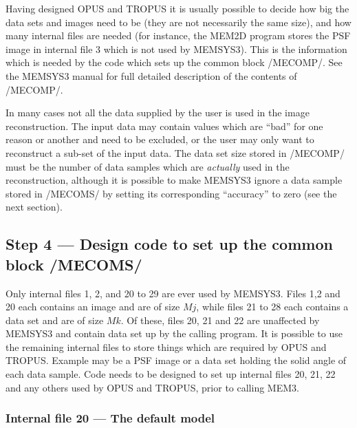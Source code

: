 Having designed OPUS and TROPUS it is usually possible to decide how big the 
data sets and images need to be (they are not necessarily the same size), 
and how many internal files are needed (for instance, the MEM2D program stores 
the PSF image in internal file 3 which is not used by MEMSYS3).
This is the information which is needed by the code which sets up the common 
block /MECOMP/. See the MEMSYS3 manual for full detailed description of the 
contents of /MECOMP/.


In many cases not all the data supplied by the user is used in the image
reconstruction. The input data may contain values which are ``bad'' for one 
reason or another and need to be excluded, or the user may only want to 
reconstruct a sub-set of the input data. The data set size stored in /MECOMP/
must be the number of data samples which are {\em actually} used in the 
reconstruction, although it is possible to make MEMSYS3 ignore a data sample 
stored in /MECOMS/ by setting its corresponding ``accuracy'' to zero (see the 
next section).

\subsection {Step 4 --- Design code to set up the common block /MECOMS/}

Only internal files 1, 2, and 20 to 29 are ever used by MEMSYS3. Files 1,2
and 20 each contains an image and are of size $Mj$, while files 21 to 28 each
contains a data set and are of size $Mk$. Of these, files 20, 21 and 22 are
unaffected by MEMSYS3 and contain data set up by the calling program. It is 
possible to use the remaining internal files to store things which are required 
by OPUS and TROPUS. Example may be a PSF image or a data set holding the solid 
angle of each data sample. Code needs to be designed to set up internal 
files 20, 21, 22 and any others used by OPUS and TROPUS, prior to calling MEM3.

\subsubsection {Internal file 20 --- The default model}


